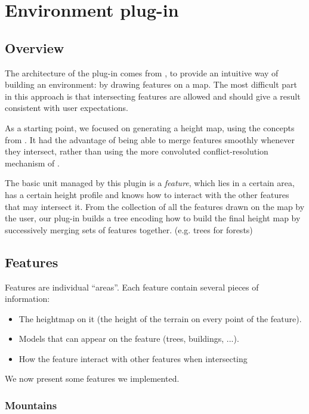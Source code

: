 \section{Environment plug-in}

\subsection{Overview}

The architecture of the plug-in comes from
\cite{DeclarativeArchitecture}, to provide an intuitive way of
building an environment: by drawing features on a map. The most
difficult part in this approach is that intersecting features are
allowed and should give a result consistent with user expectations.

As a starting point, we focused on generating a height map, using the
concepts from \cite{FeatureTree}. It had the advantage of being able
to merge features smoothly whenever they intersect, rather than using
the more convoluted conflict-resolution mechanism of
\cite{DeclarativeArchitecture}.

\bigskip

The basic unit managed by this plugin is a \emph{feature}, which lies
in a certain area, has a certain height profile and knows how to
interact with the other features that may intersect it. From the
collection of all the features drawn on the map by the user, our
plug-in builds a tree encoding how to build the final height map by
successively merging sets of features together.  %
(e.g. trees for forests)



\subsection{Features}
Features are individual ``areas''. Each feature contain several pieces of information:
\begin{itemize}
  \item The heightmap on it (the height of the terrain on every point of the feature).
  \item Models that can appear on the feature (trees, buildings, ...).
  \item How the feature interact with other features when intersecting
\end{itemize}
We now present some features we implemented.

\subsubsection{Mountains}

